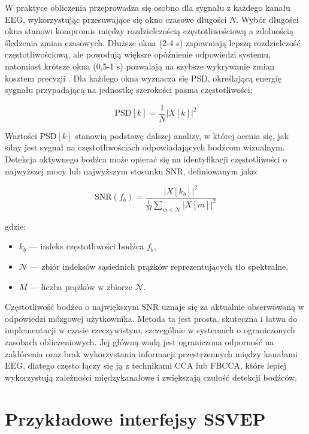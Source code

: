 W praktyce obliczenia przeprowadza się osobno dla sygnału z każdego kanału EEG, wykorzystując przesuwające się okno czasowe długości $N$. Wybór długości okna stanowi kompromis między rozdzielczością częstotliwościową a zdolnością śledzenia zmian czasowych. Dłuższe okna (2-4 s) zapewniają lepszą rozdzielczość częstotliwościową, ale powodują większe opóźnienie odpowiedzi systemu, natomiast krótsze okna (0,5-1 s) pozwalają na szybsze wykrywanie zmian kosztem precyzji \cite{guger2012}. Dla każdego okna wyznacza się PSD, określającą energię sygnału przypadającą na jednostkę szerokości pasma częstotliwości:

\begin{equation}
\mathrm{PSD}[k] = \frac{1}{N} |X[k]|^2
\end{equation}

Wartości $\mathrm{PSD}[k]$ stanowią podstawę dalszej analizy, w której ocenia się, jak silny jest sygnał na częstotliwościach odpowiadających bodźcom wizualnym. Detekcja aktywnego bodźca może opierać się na identyfikacji częstotliwości o najwyższej mocy lub najwyższym stosunku SNR, definiowanym jako:

\begin{equation}
\mathrm{SNR}(f_b) = \frac{|X[k_b]|^2}{\frac{1}{M} \sum_{m \in \mathcal{N}} |X[m]|^2}
\end{equation}

\noindent gdzie:
\begin{itemize}
    \item $k_b$ — indeks częstotliwości bodźca $f_b$,
    \item $\mathcal{N}$ — zbiór indeksów sąsiednich prążków reprezentujących tło spektralne,    
    \item $M$ — liczba prążków w zbiorze $\mathcal{N}$.
\end{itemize}

Częstotliwość bodźca o największym $\mathrm{SNR}$ uznaje się za aktualnie obserwowaną w odpowiedzi mózgowej użytkownika. Metoda ta jest prosta, skuteczna i łatwa do implementacji w czasie rzeczywistym, szczególnie w systemach o ograniczonych zasobach obliczeniowych. Jej główną wadą jest ograniczona odporność na zakłócenia oraz brak wykorzystania informacji przestrzennych między kanałami EEG, dlatego często łączy się ją z technikami CCA lub FBCCA, które lepiej wykorzystują zależności międzykanałowe i zwiększają czułość detekcji bodźców.

\section{Przykładowe interfejsy SSVEP}

